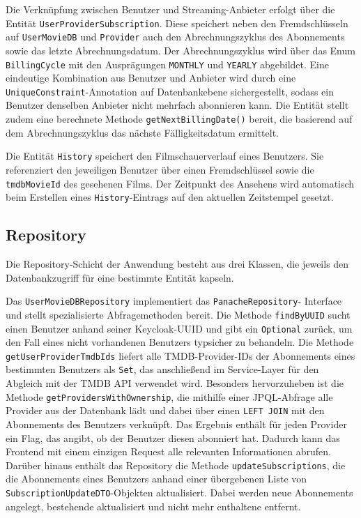 Die Verknüpfung zwischen Benutzer und Streaming-Anbieter erfolgt über die
Entität \texttt{UserProviderSubscription}. Diese speichert neben den
Fremdschlüsseln auf \texttt{UserMovieDB} und \texttt{Provider} auch den
Abrechnungszyklus des Abonnements sowie das letzte Abrechnungsdatum. Der
Abrechnungszyklus wird über das Enum \texttt{BillingCycle} mit den
Ausprägungen \texttt{MONTHLY} und \texttt{YEARLY} abgebildet. Eine eindeutige
Kombination aus Benutzer und Anbieter wird durch eine
\texttt{UniqueConstraint}-Annotation auf Datenbankebene sichergestellt, sodass
ein Benutzer denselben Anbieter nicht mehrfach abonnieren kann. Die Entität
stellt zudem eine berechnete Methode \texttt{getNextBillingDate()} bereit, die
basierend auf dem Abrechnungszyklus das nächste Fälligkeitsdatum ermittelt.

Die Entität \texttt{History} speichert den Filmschauerverlauf eines Benutzers.
Sie referenziert den jeweiligen Benutzer über einen Fremdschlüssel sowie die
\texttt{tmdbMovieId} des gesehenen Films. Der Zeitpunkt des Ansehens wird
automatisch beim Erstellen eines \texttt{History}-Eintrags auf den aktuellen
Zeitstempel gesetzt.

\subsection{Repository}

Die Repository-Schicht der Anwendung besteht aus drei Klassen, die jeweils
den Datenbankzugriff für eine bestimmte Entität kapseln.

Das \texttt{UserMovieDBRepository} implementiert das \texttt{PanacheRepository}-
Interface und stellt spezialisierte Abfragemethoden bereit. Die Methode
\texttt{findByUUID} sucht einen Benutzer anhand seiner Keycloak-UUID und gibt
ein \texttt{Optional} zurück, um den Fall eines nicht vorhandenen Benutzers
typsicher zu behandeln. Die Methode \texttt{getUserProviderTmdbIds} liefert
alle TMDB-Provider-IDs der Abonnements eines bestimmten Benutzers als
\texttt{Set}, das anschließend im Service-Layer für den Abgleich mit der
TMDB API verwendet wird. Besonders hervorzuheben ist die Methode
\texttt{getProvidersWithOwnership}, die mithilfe einer JPQL-Abfrage alle
Provider aus der Datenbank lädt und dabei über einen \texttt{LEFT JOIN} mit
den Abonnements des Benutzers verknüpft. Das Ergebnis enthält für jeden
Provider ein Flag, das angibt, ob der Benutzer diesen abonniert hat. Dadurch
kann das Frontend mit einem einzigen Request alle relevanten Informationen
abrufen. Darüber hinaus enthält das Repository die Methode
\texttt{updateSubscriptions}, die die Abonnements eines Benutzers anhand
einer übergebenen Liste von \texttt{SubscriptionUpdateDTO}-Objekten
aktualisiert. Dabei werden neue Abonnements angelegt, bestehende
aktualisiert und nicht mehr enthaltene entfernt.

